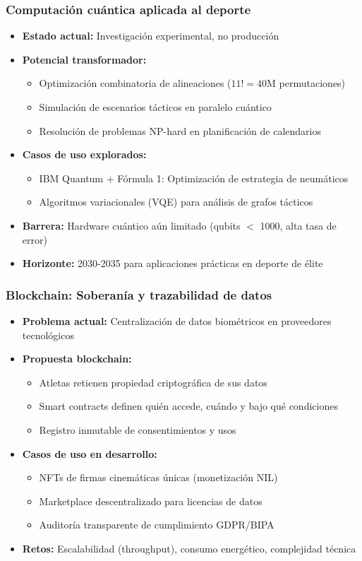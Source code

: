\documentclass[aspectratio=169]{beamer}
\begin{document}
\begin{frame}\frametitle{Computación cuántica aplicada al deporte}
\begin{itemize}
    \item \textbf{Estado actual:} Investigación experimental, no producción
    \item \textbf{Potencial transformador:}
    \begin{itemize}
        \item Optimización combinatoria de alineaciones ($11! = 40$M permutaciones)
        \item Simulación de escenarios tácticos en paralelo cuántico
        \item Resolución de problemas NP-hard en planificación de calendarios
    \end{itemize}
    \item \textbf{Casos de uso explorados:}
    \begin{itemize}
        \item IBM Quantum $+$ Fórmula 1: Optimización de estrategia de neumáticos
        \item Algoritmos variacionales (VQE) para análisis de grafos tácticos
    \end{itemize}
    \item \textbf{Barrera:} Hardware cuántico aún limitado (qubits $<$ 1000, alta tasa de error)
    \item \textbf{Horizonte:} 2030-2035 para aplicaciones prácticas en deporte de élite
\end{itemize}
\end{frame}

\begin{frame}\frametitle{Blockchain: Soberanía y trazabilidad de datos}
\begin{itemize}
    \item \textbf{Problema actual:} Centralización de datos biométricos en proveedores tecnológicos
    \item \textbf{Propuesta blockchain:}
    \begin{itemize}
        \item Atletas retienen propiedad criptográfica de sus datos
        \item Smart contracts definen quién accede, cuándo y bajo qué condiciones
        \item Registro inmutable de consentimientos y usos
    \end{itemize}
    \item \textbf{Casos de uso en desarrollo:}
    \begin{itemize}
        \item NFTs de firmas cinemáticas únicas (monetización NIL)
        \item Marketplace descentralizado para licencias de datos
        \item Auditoría transparente de cumplimiento GDPR/BIPA
    \end{itemize}
    \item \textbf{Retos:} Escalabilidad (throughput), consumo energético, complejidad técnica
\end{itemize}
\end{frame}
\end{document}
